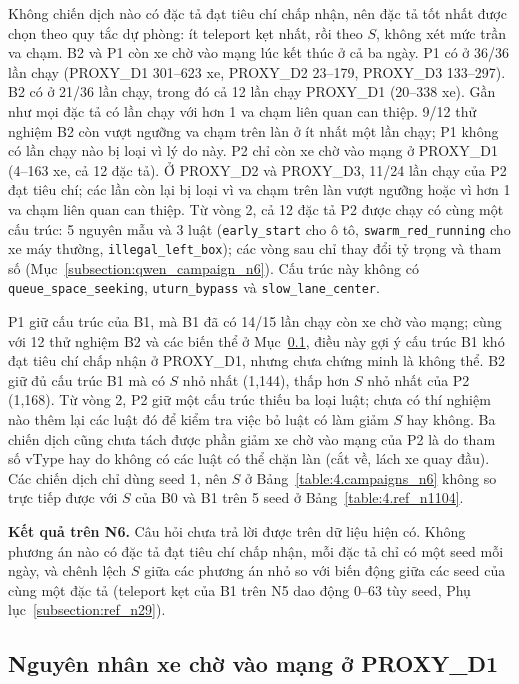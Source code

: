 \documentclass[../main.tex]{subfiles}
\begin{document}
\begin{sloppypar}
Không chiến dịch nào có đặc tả đạt tiêu chí chấp nhận, nên đặc tả tốt nhất được chọn theo quy tắc dự phòng: ít teleport kẹt nhất, rồi theo $S$, không xét mức trần va chạm. B2 và P1 còn xe chờ vào mạng lúc kết thúc ở cả ba ngày. P1 có ở 36/36 lần chạy (PROXY\_D1 301--623 xe, PROXY\_D2 23--179, PROXY\_D3 133--297). B2 có ở 21/36 lần chạy, trong đó cả 12 lần chạy PROXY\_D1 (20--338 xe). Gần như mọi đặc tả có lần chạy với hơn 1 va chạm liên quan can thiệp. 9/12 thử nghiệm B2 còn vượt ngưỡng va chạm trên làn ở ít nhất một lần chạy; P1 không có lần chạy nào bị loại vì lý do này. P2 chỉ còn xe chờ vào mạng ở PROXY\_D1 (4--163 xe, cả 12 đặc tả). Ở PROXY\_D2 và PROXY\_D3, 11/24 lần chạy của P2 đạt tiêu chí; các lần còn lại bị loại vì va chạm trên làn vượt ngưỡng hoặc vì hơn 1 va chạm liên quan can thiệp. Từ vòng 2, cả 12 đặc tả P2 được chạy có cùng một cấu trúc: 5 nguyên mẫu và 3 luật (\texttt{early\_start} cho ô tô, \texttt{swarm\_red\_running} cho xe máy thường, \texttt{illegal\_left\_box}); các vòng sau chỉ thay đổi tỷ trọng và tham số (Mục~\ref{subsection:qwen_campaign_n6}). Cấu trúc này không có \texttt{queue\_space\_seeking}, \texttt{uturn\_bypass} và \texttt{slow\_lane\_center}.
\end{sloppypar}

P1 giữ cấu trúc của B1, mà B1 đã có 14/15 lần chạy còn xe chờ vào mạng; cùng với 12 thử nghiệm B2 và các biến thể ở Mục~\ref{subsection:d1_backlog}, điều này gợi ý cấu trúc B1 khó đạt tiêu chí chấp nhận ở PROXY\_D1, nhưng chưa chứng minh là không thể. B2 giữ đủ cấu trúc B1 mà có $S$ nhỏ nhất (1,144), thấp hơn $S$ nhỏ nhất của P2 (1,168). Từ vòng 2, P2 giữ một cấu trúc thiếu ba loại luật; chưa có thí nghiệm nào thêm lại các luật đó để kiểm tra việc bỏ luật có làm giảm $S$ hay không. Ba chiến dịch cũng chưa tách được phần giảm xe chờ vào mạng của P2 là do tham số vType hay do không có các luật có thể chặn làn (cắt về, lách xe quay đầu). Các chiến dịch chỉ dùng seed 1, nên $S$ ở Bảng~\ref{table:4.campaigns_n6} không so trực tiếp được với $S$ của B0 và B1 trên 5 seed ở Bảng~\ref{table:4.ref_n1104}.

\textbf{Kết quả trên N6.} Câu hỏi chưa trả lời được trên dữ liệu hiện có. Không phương án nào có đặc tả đạt tiêu chí chấp nhận, mỗi đặc tả chỉ có một seed mỗi ngày, và chênh lệch $S$ giữa các phương án nhỏ so với biến động giữa các seed của cùng một đặc tả (teleport kẹt của B1 trên N5 dao động 0--63 tùy seed, Phụ lục~\ref{subsection:ref_n29}).

\subsection{Nguyên nhân xe chờ vào mạng ở PROXY\_D1}
\label{subsection:d1_backlog}
\end{document}
